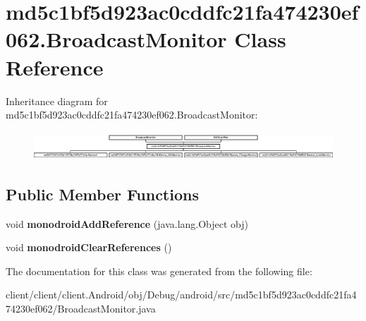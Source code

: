 \hypertarget{classmd5c1bf5d923ac0cddfc21fa474230ef062_1_1BroadcastMonitor}{}\section{md5c1bf5d923ac0cddfc21fa474230ef062.\+Broadcast\+Monitor Class Reference}
\label{classmd5c1bf5d923ac0cddfc21fa474230ef062_1_1BroadcastMonitor}
Inheritance diagram for md5c1bf5d923ac0cddfc21fa474230ef062.\+Broadcast\+Monitor\+:\begin{figure}[H]
\begin{center}
\leavevmode
\includegraphics[height=1.060606cm]{classmd5c1bf5d923ac0cddfc21fa474230ef062_1_1BroadcastMonitor}
\end{center}
\end{figure}
\subsection*{Public Member Functions}
\begin{DoxyCompactItemize}
\item 
\hypertarget{classmd5c1bf5d923ac0cddfc21fa474230ef062_1_1BroadcastMonitor_a17e1e7cf46a713c673a5f76a5bf5eb3c}{}void {\bfseries monodroid\+Add\+Reference} (java.\+lang.\+Object obj)\label{classmd5c1bf5d923ac0cddfc21fa474230ef062_1_1BroadcastMonitor_a17e1e7cf46a713c673a5f76a5bf5eb3c}

\item 
\hypertarget{classmd5c1bf5d923ac0cddfc21fa474230ef062_1_1BroadcastMonitor_ae24ff9fbfbe6f932911f921509c1e203}{}void {\bfseries monodroid\+Clear\+References} ()\label{classmd5c1bf5d923ac0cddfc21fa474230ef062_1_1BroadcastMonitor_ae24ff9fbfbe6f932911f921509c1e203}

\end{DoxyCompactItemize}


The documentation for this class was generated from the following file\+:\begin{DoxyCompactItemize}
\item 
client/client/client.\+Android/obj/\+Debug/android/src/md5c1bf5d923ac0cddfc21fa474230ef062/Broadcast\+Monitor.\+java\end{DoxyCompactItemize}
